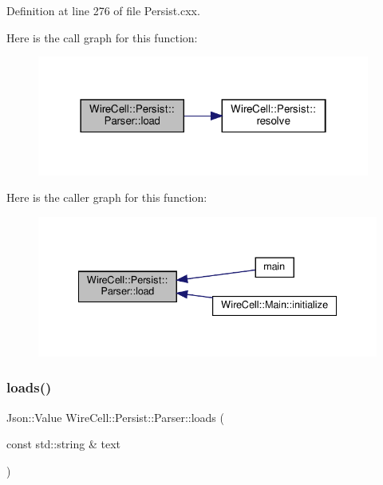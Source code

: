Definition at line 276 of file Persist.\+cxx.

Here is the call graph for this function\+:
\nopagebreak
\begin{figure}[H]
\begin{center}
\leavevmode
\includegraphics[width=310pt]{class_wire_cell_1_1_persist_1_1_parser_ac33db035695f8fa0e800f2eb6c922ef0_cgraph}
\end{center}
\end{figure}
Here is the caller graph for this function\+:
\nopagebreak
\begin{figure}[H]
\begin{center}
\leavevmode
\includegraphics[width=335pt]{class_wire_cell_1_1_persist_1_1_parser_ac33db035695f8fa0e800f2eb6c922ef0_icgraph}
\end{center}
\end{figure}
\mbox{\label{class_wire_cell_1_1_persist_1_1_parser_a3438a15f2e7c437d5c931348f1f1a29f}} 
\subsubsection{\texorpdfstring{loads()}{loads()}}
{\footnotesize\ttfamily Json\+::\+Value Wire\+Cell\+::\+Persist\+::\+Parser\+::loads (\begin{DoxyParamCaption}\item[{const std\+::string \&}]{text }\end{DoxyParamCaption})}



